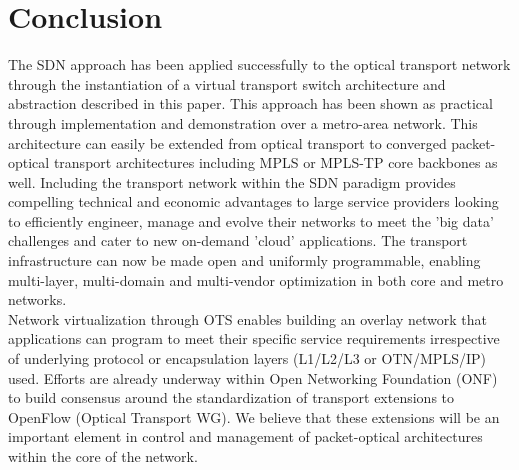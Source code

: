 \documentclass{sig-alternate-2013}
\begin{document}
\section{Conclusion}
 The SDN approach has been applied successfully to the optical transport network through the instantiation of a virtual transport switch architecture and abstraction described in this paper.
 This approach has been shown as practical through implementation and demonstration over a metro-area network. This architecture can easily be extended from optical transport to converged packet-optical transport  architectures including MPLS or MPLS-TP core backbones as well. Including the transport network within the SDN paradigm provides compelling technical and economic advantages to large service providers looking to efficiently engineer, manage and evolve their networks to meet the 'big data' challenges and cater to new on-demand 'cloud' applications. The transport infrastructure can now be made open and uniformly programmable, enabling multi-layer, multi-domain and multi-vendor optimization in both core and metro networks.\\

 Network virtualization through OTS enables building an overlay network that applications can program to  meet their specific service requirements irrespective of underlying protocol or encapsulation layers (L1/L2/L3 or OTN/MPLS/IP) used. Efforts are already underway within Open Networking Foundation (ONF) to build consensus around the standardization of transport extensions to OpenFlow (Optical Transport WG). We believe that these extensions will be an important  element in control and management of packet-optical architectures within the core of the network.


% 
\end{document}
